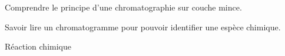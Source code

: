 \sndEnTeteSix

\vspace*{-40pt}

\begin{objectifs}
  \item Comprendre le principe d'une chromatographie sur couche mince.
  \item Savoir lire un chromatogramme pour pouvoir identifier une espèce chimique.
\end{objectifs}

\begin{contexte}
  
  \problematique{
  }
\end{contexte}


\begin{doc}{Réaction chimique}
  \vspace*{-22pt}
  \begin{encart}

  \end{encart}

\end{doc}


